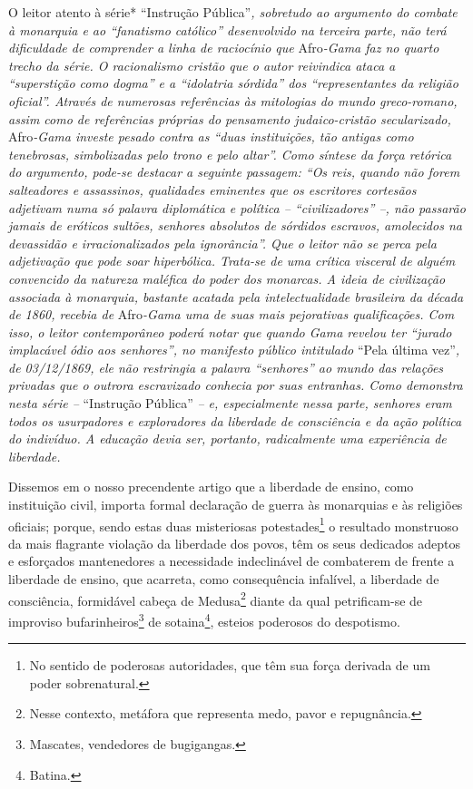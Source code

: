 \begin{didascalia}
O leitor atento à série* ``Instrução Pública''\emph{, sobretudo ao
argumento do combate à monarquia e ao ``fanatismo católico'' desenvolvido
na terceira parte, não terá dificuldade de comprender a linha de
raciocínio que} Afro\emph{-Gama faz no quarto trecho da série. O
racionalismo cristão que o autor reivindica ataca a ``superstição como
dogma'' e a ``idolatria sórdida'' dos ``representantes da religião oficial''.
Através de numerosas referências às mitologias do mundo greco-romano,
assim como de referências próprias do pensamento judaico-cristão
secularizado,} Afro\emph{-Gama investe pesado contra as ``duas
instituições, tão antigas como tenebrosas, simbolizadas pelo trono e
pelo altar''. Como síntese da força retórica do argumento, pode-se
destacar a seguinte passagem: ``Os reis, quando não forem salteadores e
assassinos, qualidades eminentes que os escritores cortesãos adjetivam
numa só palavra diplomática e política -- ``civilizadores'' --, não
passarão jamais de eróticos sultões, senhores absolutos de sórdidos
escravos, amolecidos na devassidão e irracionalizados pela ignorância''.
Que o leitor não se perca pela adjetivação que pode soar hiperbólica.
Trata-se de uma crítica visceral de alguém convencido da natureza
maléfica do poder dos monarcas. A ideia de civilização associada à
monarquia, bastante acatada pela intelectualidade brasileira da década
de 1860, recebia de} Afro\emph{-Gama uma de suas mais pejorativas
qualificações. Com isso, o leitor contemporâneo poderá notar que quando
Gama revelou ter ``jurado implacável ódio aos senhores'', no manifesto
público intitulado} ``Pela última vez''\emph{, de 03/12/1869, ele não
restringia a palavra ``senhores'' ao mundo das relações privadas que o
outrora escravizado conhecia por suas entranhas. Como demonstra nesta
série --} ``Instrução Pública'' \emph{-- e, especialmente nessa parte,
senhores eram todos os usurpadores e exploradores da liberdade de
consciência e da ação política do indivíduo. A educação devia ser,
portanto, radicalmente uma experiência de liberdade.}
\end{didascalia}

\asterisc{}

Dissemos em o nosso precendente artigo que a liberdade de ensino, como
instituição civil, importa formal declaração de guerra às monarquias e
às religiões oficiais; porque, sendo estas duas misteriosas
potestades\footnote{No sentido de poderosas autoridades, que têm sua
  força derivada de um poder sobrenatural.} o resultado monstruoso da
mais flagrante violação da liberdade dos povos, têm os seus dedicados
adeptos e esforçados mantenedores a necessidade indeclinável de
combaterem de frente a liberdade de ensino, que acarreta, como
consequência infalível, a liberdade de consciência, formidável cabeça de
Medusa\footnote{Nesse contexto, metáfora que representa medo, pavor e
  repugnância.} diante da qual petrificam-se de improviso
bufarinheiros\footnote{Mascates, vendedores de bugigangas.} de
sotaina\footnote{Batina.}, esteios poderosos do despotismo.

